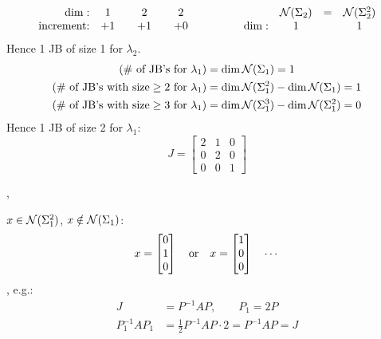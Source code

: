 \begin{example}
\[\begin{array}{r@{\quad}ccccc}
\dim: & 1 & & 2 & & 2\\
\text{increment:} & +1 & & +1 & & +0
\end{array}
\qquad\qquad
\begin{array}{r@{\quad}ccc}
 & \Null(\Sigma_2) & = & \Null(\Sigma_2^2)\\
\dim: & 1 & & 1
\end{array}
\]
Hence 1 JB of size 1 for $\lambda_2$.
\begin{align*}
(\#\text{ of JB's for }\lambda_1)&=\dim\mathcal{N}(\Sigma_1)=1\\
(\#\text{ of JB's with size}\geq2\text{ for }\lambda_1)&=\dim\mathcal{N}(\Sigma_1^2)-\dim\mathcal{N}(\Sigma_1)=1\\
(\#\text{ of JB's with size}\geq3\text{ for }\lambda_1)&=\dim\mathcal{N}(\Sigma_1^3)-\dim\mathcal{N}(\Sigma_1^2)=0
\end{align*}
Hence 1 JB of size 2 for $\lambda_1$:
\[
J=\left[\begin{array}{cc|c}2&1&0\\0&2&0\\\hline 0&0&1\end{array}\right]
\]

\sep
\begin{minipage}[c]{0.32\textwidth}
\centering
{}
\end{minipage}\hfill
\begin{minipage}[c]{0.64\textwidth}
$x\in\mathcal{N}(\Sigma_1^2)$, \quad $x\notin\mathcal{N}(\Sigma_1)$:
\[
x=\begin{bmatrix}0\\1\\0\end{bmatrix}\quad\text{or}\quad x=\begin{bmatrix}1\\0\\0\end{bmatrix}\quad\cdots
\]
, e.g.:
\begin{align*}
J&=P^{-1}AP, \qquad P_1=2P\\
P_1^{-1}AP_1&=\tfrac12 P^{-1}AP\cdot 2=P^{-1}AP=J
\end{align*}
\end{minipage}


\end{example}
